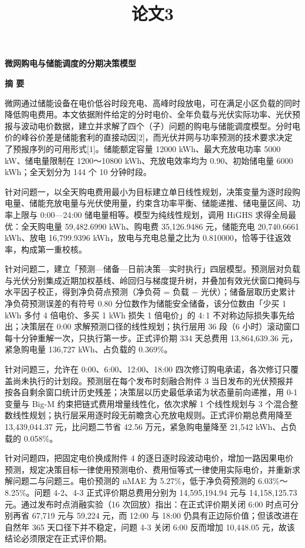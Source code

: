 \documentclass[12pt,a4paper]{ctexart}
\title{论文3}
\date{}
\begin{document}
\begin{center}\Large\bfseries 微网购电与储能调度的分期决策模型\end{center}

\begin{center}\Large\bfseries 摘 要\end{center}

微网通过储能设备在电价低谷时段充电、高峰时段放电，可在满足小区负载的同时降低购电费用。本文依据附件给定的分时电价、全年负载与光伏实际功率、光伏预报与波动电价数据，建立并求解了四个（子）问题的购电与储能调度模型。分时电价的峰谷价差是储能套利的直接动因[2]，而光伏并网与功率预测的技术要求决定了预报序列的可用形式[1]。储能额定容量 12000 kWh、最大充放电功率 5000 kW、储电量限制在 1200～10800 kWh、充放电效率均为 0.90、初始储电量 6000 kWh；全天划分为 144 个 10 分钟时段。

针对问题一，以全天购电费用最小为目标建立单日线性规划，决策变量为逐时段购电量、储能充放电量与光伏使用量，约束含功率平衡、储能递推、储电量区间、功率上限与 0:00—24:00 储电量相等。模型为纯线性规划，调用 HiGHS 求得全局最优：全天购电量 59,482.6990 kWh、购电费 35,126.9486 元，储能充电 20,740.6661 kWh、放电 16,799.9396 kWh，放电与充电总量之比为 0.810000，恰等于往返效率，构成第一重校核。

针对问题二，建立「预测—储备—日前决策—实时执行」四层模型。预测层对负载与光伏分别集成近期加权基线、岭回归与梯度提升树，并叠加有效光伏窗口掩码与水平因子校正，得到净负荷点预测（净负荷 = 负载 − 光伏）；储备层取历史累计净负荷预测误差的有符号 0.80 分位数作为储能安全储备，该分位数由「少买 1 kWh 多付 4 倍电价、多买 1 kWh 损失 1 倍电价」的 4$:$1 不对称边际损失事先给出；决策层在 0:00 求解预测口径的线性规划；执行层用 36 段（6 小时）滚动窗口每十分钟重解一次，只执行第一步。正式评价期 334 天总费用 13,864,639.36 元，紧急购电量 136,727 kWh、占负载的 0.369\%。

针对问题三，允许在 0:00、6:00、12:00、18:00 四次修订购电承诺，各次修订只覆盖尚未执行的计划段。预测层在每个发布时刻融合附件 3 当日发布的光伏预报并按各自剩余窗口统计历史残差；决策层以历史最低承诺为状态量前向递推，用 0-1 变量与 Big-M 约束把链式费用增量线性化，依次求解 1 个线性规划与 3 个混合整数线性规划；执行层采用逐时段无前瞻贪心充放电规则。正式评价期总费用降至 13,439,044.37 元，比问题二节省 42.56 万元，紧急购电量降至 21,542 kWh、占负载的 0.058\%。

针对问题四，把固定电价换成附件 4 的逐日逐时段波动电价，增加一路因果电价预测，规定决策目标一律使用预测电价、费用恒等式一律使用实际电价，并重新求解问题二与问题三。电价预测的 nMAE 为 5.27\%，低于净负荷预测的 6.03\%～8.25\%。问题 4-2、4-3 正式评价期总费用分别为 14,595,194.94 元与 14,158,125.73 元。通过发布时点消融实验（16 次回放）指出：在正式评价期关闭 6:00 时点可分别再省 67,719 元与 59,224 元，而 12:00 与 18:00 仍具有正边际价值；但该改进在自然年 365 天口径下并不稳定，问题 4-3 关闭 6:00 反而增加 10,448.05 元，故该结论必须限定在正式评价期。
\end{document}
